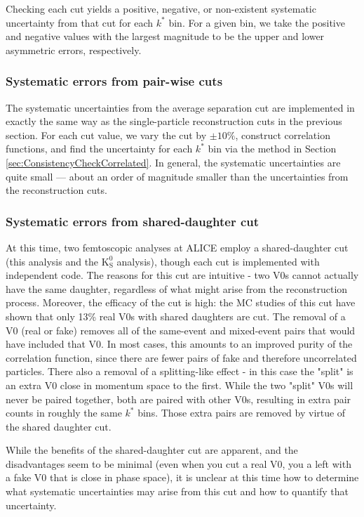 Checking each cut yields a positive, negative, or non-existent systematic uncertainty from that cut for each $k^*$ bin. 
For a given bin, we take the positive and negative values with the largest magnitude to be the upper and lower asymmetric errors, respectively.


\subsubsection{Systematic errors from pair-wise cuts}
\label{sec:SystematicsPairWise}

The systematic uncertainties from the average separation cut are implemented in exactly the same way as the single-particle reconstruction cuts in the previous section. 
For each cut value, we vary the cut by $\pm10\%$, construct correlation functions, and find the uncertainty for each $k^*$ bin via the method in Section \ref{sec:ConsistencyCheckCorrelated}.
In general, the systematic uncertainties are quite small --- about an order of magnitude smaller than the uncertainties from the reconstruction cuts.

\subsubsection{Systematic errors from shared-daughter cut}

At this time, two femtoscopic analyses at ALICE employ a shared-daughter cut (this analysis and the $\mathrm{K}^0_\mathrm{S}$ analysis), though each cut is implemented with independent code.  
The reasons for this cut are intuitive - two V0s cannot actually have the same daughter, regardless of what might arise from the reconstruction process.  
Moreover, the efficacy of the cut is high: the MC studies of this cut have shown that only 13\% real V0s with shared daughters are cut.  
The removal of a V0 (real or fake) removes all of the same-event and mixed-event pairs that would have included that V0.  
In most cases, this amounts to an improved purity of the correlation function, since there are fewer pairs of fake and therefore uncorrelated particles.  
There also a removal of a splitting-like effect - in this case the "split" is an extra V0 close in momentum space to the first.  
While the two "split" V0s will never be paired together, both are paired with other V0s, resulting in extra pair counts in roughly the same $k^*$ bins.  
Those extra pairs are removed by virtue of the shared daughter cut.

While the benefits of the shared-daughter cut are apparent,
and the disadvantages seem to be minimal (even when you cut a real V0, you a left with a fake V0 that is close in phase space), it is unclear at this time how to determine what systematic uncertainties may arise from this cut and how to quantify that uncertainty.

